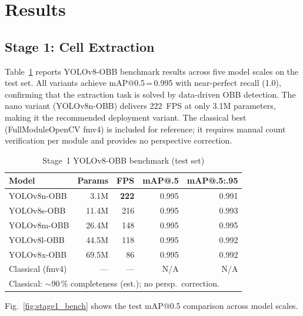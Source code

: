 \documentclass[conference]{IEEEtran}
\begin{document}
\section{Results}
\label{sec:results}

\subsection{Stage 1: Cell Extraction}

Table~\ref{tab:stage1_results} reports YOLOv8-OBB benchmark
results across five model scales on the test set.
All variants achieve mAP@0.5\,=\,0.995 with near-perfect
recall (1.0), confirming that the extraction task is solved
by data-driven OBB detection. The nano variant (YOLOv8n-OBB)
delivers 222~FPS at only 3.1M parameters, making it the
recommended deployment variant. The classical best
(FullModuleOpenCV fmv4) is included for reference; it requires
manual count verification per module and provides no
perspective correction.

\begin{table}[t]
  \caption{Stage~1 YOLOv8-OBB benchmark (test set)}
  \label{tab:stage1_results}
  \begin{center}
  \renewcommand{\arraystretch}{1.05}
  \small
  \begin{tabular}{lrrrr}
    \toprule
    \textbf{Model} &
    \textbf{Params} &
    \textbf{FPS} &
    \textbf{mAP@.5} &
    \textbf{mAP@.5:.95} \\
    \midrule
    YOLOv8n-OBB & 3.1M & \textbf{222} & 0.995 & 0.991 \\
    YOLOv8s-OBB & 11.4M & 216 & 0.995 & 0.993 \\
    YOLOv8m-OBB & 26.4M & 148 & 0.995 & 0.995 \\
    YOLOv8l-OBB & 44.5M & 118 & 0.995 & 0.992 \\
    YOLOv8x-OBB & 69.5M & 86  & 0.995 & 0.992 \\
    \midrule
    Classical (fmv4) & --- & --- & N/A & N/A \\
    \bottomrule
    \multicolumn{5}{l}{\footnotesize Classical: $\sim$90\,\%
    completeness (est.); no persp.\ correction.}
  \end{tabular}
  \end{center}
\end{table}

Fig.~\ref{fig:stage1_bench} shows the test mAP@0.5 comparison
across model scales.
\end{document}
